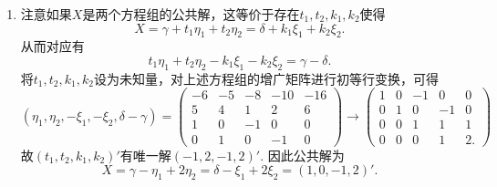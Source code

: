 \begin{enumerate}
    \item 注意如果$X$是两个方程组的公共解，这等价于存在$t_1,t_2,k_1,k_2$使得
          \[ X=\gamma+t_1\eta_1+t_2\eta_2=\delta+k_1\xi_1+k_2\xi_2. \]
          从而对应有
          \[ t_1\eta_1+t_2\eta_2-k_1\xi_1-k_2\xi_2=\gamma-\delta. \]
          将$t_1,t_2,k_1,k_2$设为未知量，对上述方程组的增广矩阵进行初等行变换，可得
          \[ (\eta_1,\eta_2,-\xi_1,-\xi_2,\delta-\gamma)=
              \begin{pmatrix}
                  -6 & -5 & -8 & -10 & -16 \\
                  5  & 4  & 1  & 2   & 6   \\
                  1  & 0  & -1 & 0   & 0   \\
                  0  & 1  & 0  & -1  & 0
              \end{pmatrix}\rightarrow
              \begin{pmatrix}
                  1 & 0 & -1 & 0  & 0  \\
                  0 & 1 & 0  & -1 & 0  \\
                  0 & 0 & 1  & 1  & 1  \\
                  0 & 0 & 0  & 1  & 2.
              \end{pmatrix} \]
          故$(t_1,t_2,k_1,k_2)'$有唯一解$(-1,2,-1,2)'$. 因此公共解为
          \[ X=\gamma-\eta_1+2\eta_2=\delta-\xi_1+2\xi_2=(1,0,-1,2)'. \]


\end{enumerate}
